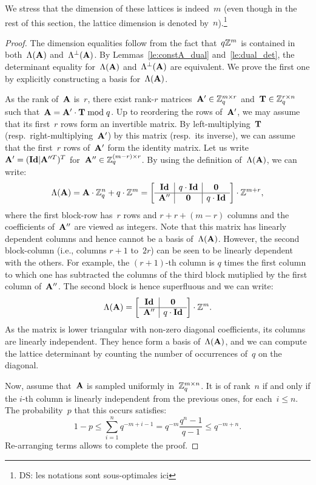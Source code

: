 We stress that the dimension of these lattices is indeed~$m$ (even though in the rest of this section, the lattice dimension is denoted
by~$n$).\footnote{DS: les notations sont sous-optimales ici} 


\begin{proof}
The dimension equalities follow from the fact that~$q \mathbb{Z}^m$ is contained in 
both~$\Lambda({\bf A})$ and~$\Lambda^{\perp}({\bf A})$. By Lemmas~\ref{le:constA_dual} and~\ref{le:dual_det},
the determinant equality for~$\Lambda({\bf A})$ and~$\Lambda^{\perp}({\bf A})$ are equivalent. We prove the first one
by explicitly constructing a basis for~$\Lambda({\bf A})$. 

As the rank of~${\bf A}$ is~$r$, there exist rank-$r$ matrices~${\bf A}' \in \mathbb{Z}_q^{m \times r}$ and~${\bf T} \in \mathbb{Z}_q^{r \times n}$ such  that~${\bf A} = {\bf A}' \cdot {\bf T} \bmod q$. Up to reordering the rows of~${\bf A}'$, we may assume that its first~$r$ rows form 
an invertible matrix. By left-multiplying~${\bf T}$ (resp.\ right-multiplying~${\bf A}'$) by this matrix (resp.\ its inverse), we can assume that the first~$r$ rows of~${\bf A}'$ form the identity matrix. Let us write~${\bf A}' = ({\bf Id} | {\bf A}''^T)^T$ for~${\bf A}'' \in \mathbb{Z}_q^{(m-r) \times r}$. By using the definition of~$\Lambda({\bf A})$, we can write:
\[
\Lambda({\bf A}) = {\bf A} \cdot \mathbb{Z}_q^n + q\cdot \mathbb{Z}^m = \left[ \begin{array}{c|c|c} 
{\bf Id} & q \cdot {\bf Id} & {\bf 0} \\ \hline
{\bf A}'' & {\bf 0} &  q \cdot {\bf Id}
\end{array}\right] \cdot \mathbb{Z}^{m+r},
\]
where the first block-row has~$r$ rows and $r+r+(m-r)$ columns and the coefficients of~${\bf A}''$ are viewed as integers. 
Note that this matrix has linearly dependent columns and hence
cannot be a basis of~$\Lambda({\bf A})$. However, the second block-column (i.e., columns $r+1$ to~$2r$) can be seen to be linearly 
dependent with the others. For example, the $(r+1)$-th column is $q$ times the first column to which one has subtracted the  columns of the third block  mutiplied by the first column of~${\bf A}''$. The second block is hence superfluous and we can write:
  \[
\Lambda({\bf A}) =  \left[ \begin{array}{c|c} 
{\bf Id} &  {\bf 0} \\ \hline
{\bf A}'' &   q \cdot {\bf Id}
\end{array}\right] \cdot \mathbb{Z}^{m}.
\]
As the matrix is lower triangular with non-zero diagonal coefficients, its columns are linearly independent. They hence form a basis of~$\Lambda({\bf A})$, and we can compute the lattice determinant by counting the number of occurrences of~$q$ on the diagonal. 

Now, assume that~${\bf A}$ is sampled uniformly in~$\mathbb{Z}_q^{m \times n}$. It is of rank~$n$ if and only if the $i$-th column is linearly independent from the previous ones, for each~$i \leq n$. The probability~$p$ that this occurs satisfies:
\[
1- p \leq \sum_{i=1}^n q^{-m+i-1}  = q^{-m} \frac{q^n-1}{q-1} \leq q^{-m+n}.
\]
Re-arranging terms allows to complete the proof.
\end{proof}

